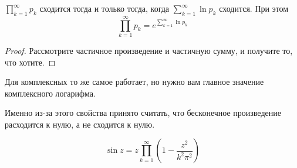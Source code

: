 \documentclass{article}
\begin{document}
    \begin{property}
        $\prod\limits_{k=1}^\infty p_k$ сходится тогда и только тогда, когда $\sum\limits_{k=1}^\infty \ln p_k$ сходится. При этом
        $$
        \prod\limits_{k=1}^\infty p_k=e^{\sum\limits_{k=1}^\infty \ln p_k}
        $$
    \end{property}
    \begin{proof}
        Рассмотрите частичное произведение и частичную сумму, и получите то, что хотите.
    \end{proof}
    \begin{remark}
        Для комплексных то же самое работает, но нужно вам главное значение комплексного логарифма.
    \end{remark}
    \begin{remark}
        Именно из-за этого свойства принято считать, что бесконечное произведение расходится к нулю, а не сходится к нулю.
    \end{remark}
    \begin{theorem}
        $$\sin z=z\prod\limits_{k=1}^\infty\left(1-\frac{z^2}{k^2\pi^2}\right)$$
    \end{theorem}
\end{document}
